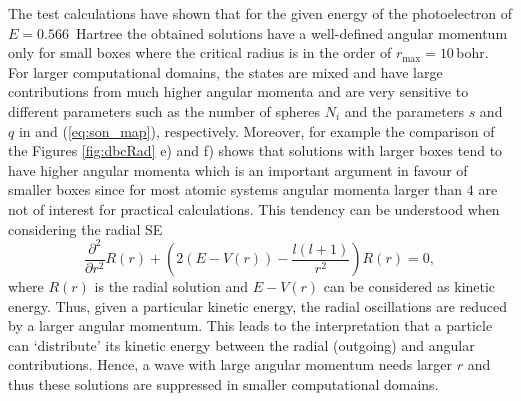 The test calculations have shown that for the given energy of the photoelectron of $E=0.566\,$ Hartree the obtained solutions have a well-defined angular momentum only for small boxes where the critical radius is in the order of $r_\text{max}=10\,$bohr.
For larger computational domains, the states are mixed and have large contributions from much higher angular momenta and are very sensitive to different parameters such as the number of spheres $N_i$ and the parameters $s$ and $q$ in   and (\ref{eq:son_map}), respectively.
Moreover, for example the comparison of the Figures \ref{fig:dbcRad} e) and f) shows that solutions with larger boxes tend to have higher angular momenta which is an important argument in favour of smaller boxes since for most atomic systems angular momenta larger than $4$ are not of interest for practical calculations.
This tendency can be understood when considering the radial SE \cite{Lifschitz}
\begin{equation}
\frac{\partial^2}{\partial r^2} R(r) + \left(2\left(E-V(r)\right) -\frac{l(l+1)}{r^2}\right) R(r)=0,
\end{equation}
where $R(r)$ is the radial solution and $E-V(r)$ can be considered as kinetic energy.
Thus, given a particular kinetic energy, the radial oscillations are reduced by a larger angular momentum.
This leads to the interpretation that a particle can `distribute' its kinetic energy between the radial (outgoing) and angular contributions.
Hence,  a wave with large angular momentum needs larger $r$ and thus these solutions are suppressed in smaller computational domains.

